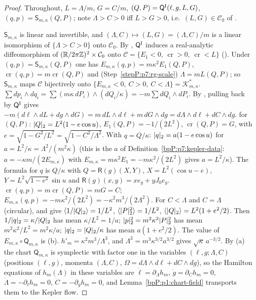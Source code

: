 \begin{proof}
Throughout, $L=\Lambda/m$, $G=C/m$, $(Q,P)=\mathsf Q^{\rm I}(\ell,g,L,G)$, $(q,p)=\mathsf S_{m,\kappa}(Q,P)$; note $\Lambda>C>0$ iff $L>G>0$, i.e.\ $(L,G)\in\mathcal C_0$ of .

\label{stepP:p7:ke-chart} $\mathsf S_{m,\kappa}$ is linear and invertible, and $(\Lambda,C)\mapsto(L,G)=(\Lambda,C)/m$ is a linear isomorphism of $\{\Lambda>C>0\}$ onto $\mathcal C_0$. By , $\mathsf Q^{\rm I}$ induces a real-analytic diffeomorphism of $(\mathbb{R}/2\pi\mathbb{Z})^2\times\mathcal C_0$ onto $\mathcal C=\{E_1<0,\ \operatorname{cr}>0,\ \operatorname{cr}<L\}$ (). Under $(q,p)=\mathsf S_{m,\kappa}(Q,P)$ one has $E_{m,\kappa}(q,p)=m\kappa^2E_1(Q,P)$, $\operatorname{cr}(q,p)=m\operatorname{cr}(Q,P)$ and (Step~\ref{stepP:p7:rg-scale}) $\Lambda=mL(Q,P)$; so $\mathsf S_{m,\kappa}$ maps $\mathcal C$ bijectively onto $\{E_{m,\kappa}<0,\ C>0,\ C<\Lambda\}=\mathcal K^*_{m,\kappa}$.
\label{stepP:p7:ke-form} $\sum dp_i\wedge dq_i=\sum(m\kappa\,dP_i)\wedge(dQ_i/\kappa)=-m\sum dQ_i\wedge dP_i$. By , pulling back by $\mathsf Q^{\rm I}$ gives $-m(d\ell\wedge dL+dg\wedge dG)=m\,dL\wedge d\ell+m\,dG\wedge dg=d\Lambda\wedge d\ell+dC\wedge dg$.
\label{stepP:p7:ke-b}  for $(Q,P)$: $\lvert Q\rvert_2=L^2(1-e\cos u)$, $E_1(Q,P)=-1/(2L^2)$, $\operatorname{cr}(Q,P)=G$, with $e=\sqrt{1-G^2/L^2}=\sqrt{1-C^2/\Lambda^2}$. With $q=Q/\kappa$: $\lvert q\rvert_2=a(1-e\cos u)$ for $a=L^2/\kappa=\Lambda^2/(m^2\kappa)$ (this is the $a$ of Definition~\ref{bpP:p7:kepler-data}: $a=-\kappa m/(2E_{m,\kappa})$ with $E_{m,\kappa}=m\kappa^2E_1=-m\kappa^2/(2L^2)$ gives $a=L^2/\kappa$). The formula for $q$ is $Q/\kappa$ with $Q=\mathsf R(g)(X,Y)$, $X=L^2(\cos u-e)$, $Y=L^2\sqrt{1-e^2}\sin u$ and $\mathsf R(g)(x,y)=xe_g+yJ_0e_g$. $\operatorname{cr}(q,p)=m\operatorname{cr}(Q,P)=mG=C$; $E_{m,\kappa}(q,p)=-m\kappa^2/(2L^2)=-\kappa^2m^3/(2\Lambda^2)$.
\label{stepP:p7:ke-c} For $C<\Lambda$ and $C=\Lambda$ (circular),  and  give $\langle1/\lvert Q\rvert_2\rangle=1/L^2$, $\langle\lvert P\rvert_2^2\rangle=1/L^2$, $\langle\lvert Q\rvert_2\rangle=L^2(1+e^2/2)$. Then $1/\lvert q\rvert_2=\kappa/\lvert Q\rvert_2$ has mean $\kappa/L^2=1/a$; $\lvert p\rvert_2^2=m^2\kappa^2\lvert P\rvert_2^2$ has mean $m^2\kappa^2/L^2=m^2\kappa/a$; $\lvert q\rvert_2=\lvert Q\rvert_2/\kappa$ has mean $a(1+e^2/2)$.
\label{stepP:p7:ke-d} The value of $E_{m,\kappa}\circ\mathsf Q_{m,\kappa}$ is (b). $h'_m=\kappa^2m^3/\Lambda^3$, and $\Lambda^3=m^3\kappa^{3/2}a^{3/2}$ gives $\sqrt\kappa\,a^{-3/2}$. By (a) the chart $\mathsf Q_{m,\kappa}$ is symplectic with factor one in the variables $(\ell,g;\Lambda,C)$ (positions $(\ell,g)$, momenta $(\Lambda,C)$, $\Omega=d\Lambda\wedge d\ell+dC\wedge dg$), so the Hamilton equations of $h_m(\Lambda)$ in these variables are $\dot\ell=\partial_\Lambda h_m$, $\dot g=\partial_Ch_m=0$, $\dot\Lambda=-\partial_\ell h_m=0$, $\dot C=-\partial_gh_m=0$, and Lemma~\ref{bpP:p1:chart-field} transports them to the Kepler flow.
\end{proof}

